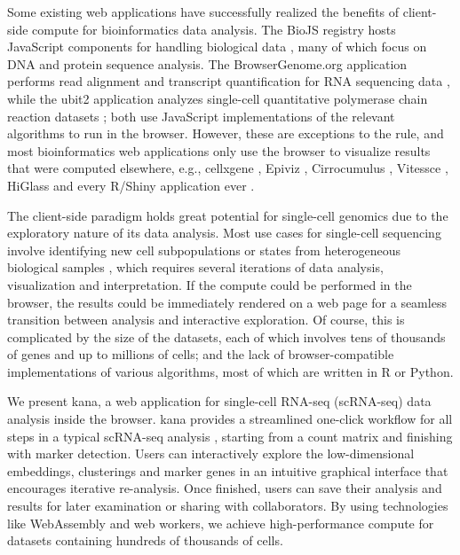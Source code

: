 \documentclass{article}
\begin{document}
Some existing web applications have successfully realized the benefits of client-side compute for bioinformatics data analysis.
The BioJS registry hosts JavaScript components for handling biological data \cite{gomez2013biojs}, many of which focus on DNA and protein sequence analysis.
The BrowserGenome.org application performs read alignment and transcript quantification for RNA sequencing data \cite{schmid2015browsergenome},
while the ubit2 application analyzes single-cell quantitative polymerase chain reaction datasets \cite{fan2017ubit2};
both use JavaScript implementations of the relevant algorithms to run in the browser.
However, these are exceptions to the rule, and most bioinformatics web applications only use the browser to visualize results that were computed elsewhere,
e.g., cellxgene \cite{megill2021cellxgene}, Epiviz \cite{chelaru2014epiviz}, Cirrocumulus \cite{cirrocumulus}, Vitessce \cite{vitessce}, HiGlass \cite{kerpedjiev2018higlass} and every R/Shiny application ever \cite{shiny}.

The client-side paradigm holds great potential for single-cell genomics due to the exploratory nature of its data analysis.
Most use cases for single-cell sequencing involve identifying new cell subpopulations or states from heterogeneous biological samples \cite{stegle2015computational},
which requires several iterations of data analysis, visualization and interpretation.
If the compute could be performed in the browser, the results could be immediately rendered on a web page for a seamless transition between analysis and interactive exploration.
Of course, this is complicated by the size of the datasets, each of which involves tens of thousands of genes and up to millions of cells;
and the lack of browser-compatible implementations of various algorithms, most of which are written in R or Python.

We present kana, a web application for single-cell RNA-seq (scRNA-seq) data analysis inside the browser.
kana provides a streamlined one-click workflow for all steps in a typical scRNA-seq analysis \cite{amezquita2020orchestrating}, 
starting from a count matrix and finishing with marker detection.
Users can interactively explore the low-dimensional embeddings, clusterings and marker genes in an intuitive graphical interface that encourages iterative re-analysis.
Once finished, users can save their analysis and results for later examination or sharing with collaborators.
By using technologies like WebAssembly and web workers, we achieve high-performance compute for datasets containing hundreds of thousands of cells.
\end{document}
